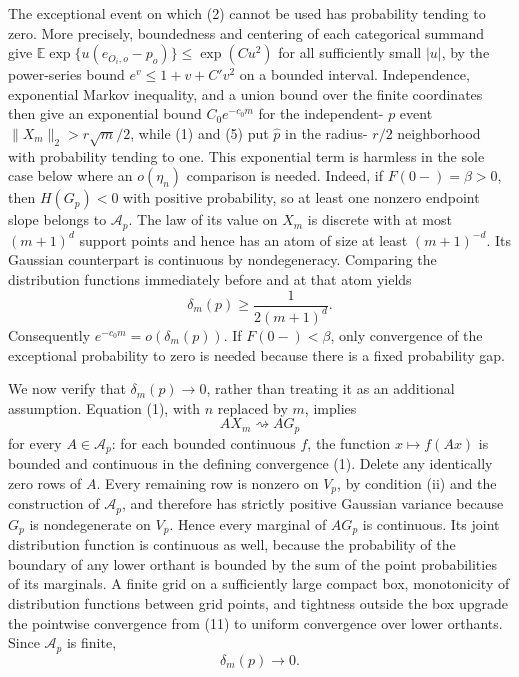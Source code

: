 The exceptional event on which (2) cannot be used has probability tending to zero.  More precisely, boundedness and centering of each categorical summand give \(\mathbb E\exp\{u(e_{O_i,o}-p_o)\}\leq\exp(Cu^2)\) for all sufficiently small \(|u|\), by the power-series bound \(e^v\leq1+v+C'v^2\) on a bounded interval.  Independence, exponential Markov inequality, and a union bound over the finite coordinates then give an exponential bound \(C_0e^{-c_0m}\) for the independent-
\(p\) event \(\|X_m\|_2>r\sqrt m/2\), while (1) and (5) put \(\widehat p\) in the radius-
\(r/2\) neighborhood with probability tending to one.  This exponential term is harmless in the sole case below where an \(o(\eta_n)\) comparison is needed.  Indeed, if \(F(0-)=\beta>0\), then \(H(G_p)<0\) with positive probability, so at least one nonzero endpoint slope belongs to \(\mathcal A_p\).  The law of its value on \(X_m\) is discrete with at most \((m+1)^d\) support points and hence has an atom of size at least \((m+1)^{-d}\).  Its Gaussian counterpart is continuous by nondegeneracy.  Comparing the distribution functions immediately before and at that atom yields
\[
\delta_m(p)\geq\frac{1}{2(m+1)^d}.
\tag{10}
\]
Consequently \(e^{-c_0m}=o(\delta_m(p))\).  If \(F(0-)<\beta\), only convergence of the exceptional probability to zero is needed because there is a fixed probability gap.

We now verify that \(\delta_m(p)\to0\), rather than treating it as an additional assumption.  Equation (1), with \(n\) replaced by \(m\), implies
\[
AX_m\rightsquigarrow AG_p
\tag{11}
\]
for every \(A\in\mathcal A_p\): for each bounded continuous \(f\), the function \(x\mapsto f(Ax)\) is bounded and continuous in the defining convergence (1).  Delete any identically zero rows of \(A\).  Every remaining row is nonzero on \(V_p\), by condition (ii) and the construction of \(\mathcal A_p\), and therefore has strictly positive Gaussian variance because \(G_p\) is nondegenerate on \(V_p\).  Hence every marginal of \(AG_p\) is continuous.  Its joint distribution function is continuous as well, because the probability of the boundary of any lower orthant is bounded by the sum of the point probabilities of its marginals.  A finite grid on a sufficiently large compact box, monotonicity of distribution functions between grid points, and tightness outside the box upgrade the pointwise convergence from (11) to uniform convergence over lower orthants.  Since \(\mathcal A_p\) is finite,
\[
\delta_m(p)\longrightarrow0.
\tag{12}
\]


